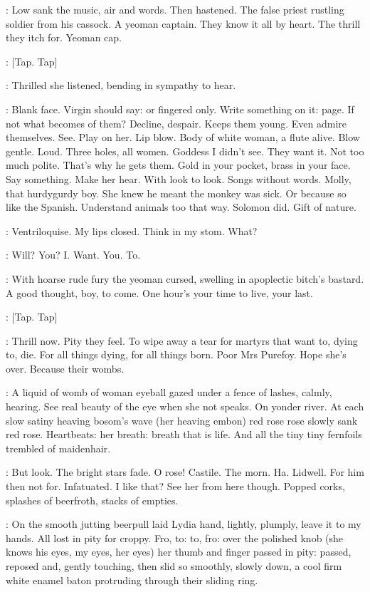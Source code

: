 :
Low sank the music, air and words. Then hastened. The false priest
rustling soldier from his cassock. A yeoman captain. They know it all by
heart. The thrill they itch for. Yeoman cap.

\Stripling:
[Tap. Tap]

:
Thrilled she listened, bending in sympathy to hear.

\BloomInt:
Blank face. Virgin should say: or fingered only. Write something on
it: page. If not what becomes of them? Decline, despair. Keeps them young.
Even admire themselves. See. Play on her. Lip blow. Body of white woman,
a flute alive. Blow gentle. Loud. Three holes, all women. Goddess I didn't
see. They want it.
Not too much polite. That's why he gets them. Gold in
your pocket, brass in your face. Say something. Make her hear. With look
to look. Songs without words. Molly, that hurdygurdy boy. She knew he
meant the monkey was sick. Or because so like the Spanish. Understand
animals too that way. Solomon did. Gift of nature.

\BloomInt:
Ventriloquise. My lips closed. Think in my stom. What?

\BloomInt:
Will? You? I. Want. You. To.

:
With hoarse rude fury the yeoman cursed, swelling in apoplectic
bitch's bastard. A good thought, boy, to come. One hour's your time to
live, your last.

\Stripling:
[Tap. Tap]

\BloomInt:
Thrill now. Pity they feel. To wipe away a tear for martyrs that want
to, dying to, die. For all things dying, for all things born. Poor Mrs
Purefoy. Hope she's over. Because their wombs.

\BloomInt:
A liquid of womb of woman eyeball gazed under a fence of lashes,
calmly, hearing. See real beauty of the eye when she not speaks. On yonder
river. At each slow satiny heaving bosom's wave (her heaving embon) red
rose rose slowly sank red rose. Heartbeats: her breath: breath that is
life. And all the tiny tiny fernfoils trembled of maidenhair.

\BloomInt:
But look. The bright stars fade. O rose! Castile. The morn.
Ha.
Lidwell. For him then not for. Infatuated. I like that? See her
from here though. Popped corks, splashes of beerfroth,
stacks of empties.

:
On the smooth jutting beerpull laid Lydia hand, lightly, plumply, leave
it to my hands. All lost in pity for croppy. Fro, to: to, fro: over the
polished knob (she knows his eyes, my eyes, her eyes) her thumb and finger
passed in pity: passed, reposed and, gently touching, then slid so
smoothly, slowly down, a cool firm white enamel baton protruding through
their sliding ring.

